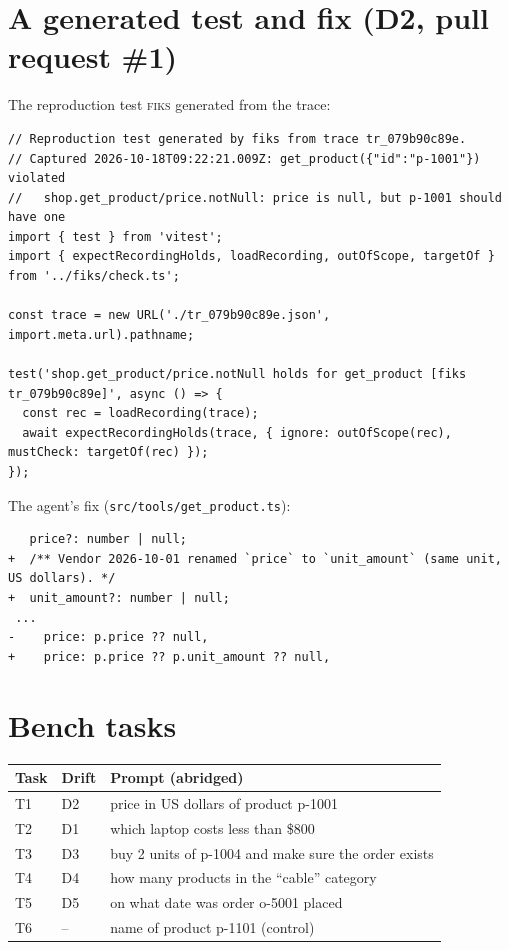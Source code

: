 \documentclass[10pt]{article}
\newcommand{\fiks}{\textsc{fiks}}
\begin{document}
\section{A generated test and fix (D2, pull request \#1)}
\label{app:sample}
The reproduction test \fiks{} generated from the trace:
\begin{lstlisting}
// Reproduction test generated by fiks from trace tr_079b90c89e.
// Captured 2026-10-18T09:22:21.009Z: get_product({"id":"p-1001"}) violated
//   shop.get_product/price.notNull: price is null, but p-1001 should have one
import { test } from 'vitest';
import { expectRecordingHolds, loadRecording, outOfScope, targetOf } from '../fiks/check.ts';

const trace = new URL('./tr_079b90c89e.json', import.meta.url).pathname;

test('shop.get_product/price.notNull holds for get_product [fiks tr_079b90c89e]', async () => {
  const rec = loadRecording(trace);
  await expectRecordingHolds(trace, { ignore: outOfScope(rec), mustCheck: targetOf(rec) });
});
\end{lstlisting}
The agent's fix (\texttt{src/tools/get\_product.ts}):
\begin{lstlisting}
   price?: number | null;
+  /** Vendor 2026-10-01 renamed `price` to `unit_amount` (same unit, US dollars). */
+  unit_amount?: number | null;
 ...
-    price: p.price ?? null,
+    price: p.price ?? p.unit_amount ?? null,
\end{lstlisting}

\section{Bench tasks}
\begin{tabular}{lll}
\toprule
Task & Drift & Prompt (abridged) \\
\midrule
T1 & D2 & price in US dollars of product p-1001 \\
T2 & D1 & which laptop costs less than \$800 \\
T3 & D3 & buy 2 units of p-1004 and make sure the order exists \\
T4 & D4 & how many products in the ``cable'' category \\
T5 & D5 & on what date was order o-5001 placed \\
T6 & -- & name of product p-1101 (control) \\
\bottomrule
\end{tabular}
\end{document}
